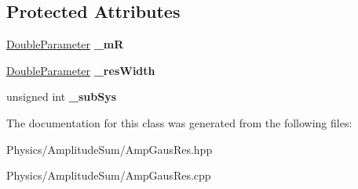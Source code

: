 \subsection*{Protected Attributes}
\begin{DoxyCompactItemize}
\item 
\hypertarget{class_amp_gaus_res_a7a629bcb5cc901a76582bcbf3fe4cebe}{\hyperlink{class_double_parameter}{Double\-Parameter} {\bfseries \-\_\-m\-R}}\label{class_amp_gaus_res_a7a629bcb5cc901a76582bcbf3fe4cebe}

\item 
\hypertarget{class_amp_gaus_res_a94215481ed03576aa8958070f4acfe81}{\hyperlink{class_double_parameter}{Double\-Parameter} {\bfseries \-\_\-res\-Width}}\label{class_amp_gaus_res_a94215481ed03576aa8958070f4acfe81}

\item 
\hypertarget{class_amp_gaus_res_a749db5ee2fa34cdb92c9bbda80d1ff85}{unsigned int {\bfseries \-\_\-sub\-Sys}}\label{class_amp_gaus_res_a749db5ee2fa34cdb92c9bbda80d1ff85}

\end{DoxyCompactItemize}


The documentation for this class was generated from the following files\-:\begin{DoxyCompactItemize}
\item 
Physics/\-Amplitude\-Sum/Amp\-Gaus\-Res.\-hpp\item 
Physics/\-Amplitude\-Sum/Amp\-Gaus\-Res.\-cpp\end{DoxyCompactItemize}
